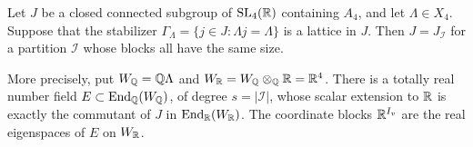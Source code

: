 \begin{lemma}
\label{lem:rig-equal-blocks}
Let \(J\) be a closed connected subgroup of \(\mathrm{SL}_4(\mathbb R)\)
containing \(A_4\), and let \(\Lambda\in X_4\).  Suppose that the
stabilizer \(\Gamma_\Lambda=\{j\in J:\Lambda j=\Lambda\}\) is a
lattice in \(J\).
Then \(J=J_{\mathcal I}\) for a partition \(\mathcal I\) whose blocks
all have the same size.

More precisely, put \(W_\mathbb Q=\mathbb Q\Lambda\) and
\(W_\mathbb R=W_\mathbb Q\otimes_\mathbb Q\mathbb R=\mathbb R^4\).  There is a totally real number field
\(E\subset\operatorname{End}_\mathbb Q(W_\mathbb Q)\), of degree \(s=|\mathcal I|\), whose scalar
extension to \(\mathbb R\) is exactly the commutant of \(J\) in
\(\operatorname{End}_\mathbb R(W_\mathbb R)\).  The coordinate blocks \(\mathbb R^{I_v}\) are the real
eigenspaces of \(E\) on \(W_\mathbb R\).
\end{lemma}

